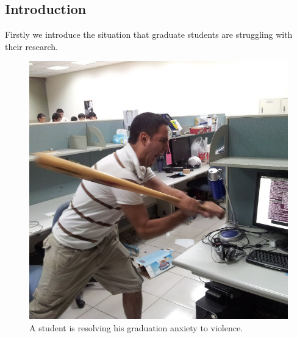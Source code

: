 \documentclass[12pt,a4paper]{report}
\begin{document}
\begin{CJK}{UTF8}{bsmi}



\beforepreface 

\clearpage\maketitle
\thispagestyle{empty}

\afterpreface 




\chapter{Introduction}
    Firstly we introduce the situation that graduate students are struggling with their research.
    
    \begin{figure}[H]
    
        \includegraphics[scale=0.35]{images/frustrated_student.jpg}
        \caption{A student is resolving his graduation anxiety to violence.}
        \label{fig:student}
    \end{figure}
    




\end{CJK}
\end{document}
